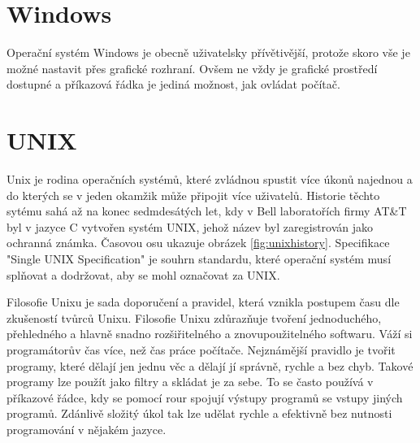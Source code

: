 \documentclass[thesis=M,czech]{FITthesis}[2012/06/26]
\begin{document}
\section{Windows}


Operační systém Windows je obecně uživatelsky přívětivější, protože skoro vše je možné nastavit přes grafické rozhraní. Ovšem ne vždy je grafické prostředí dostupné a příkazová řádka je jediná možnost, jak ovládat počítač.


\section{UNIX}

Unix je rodina operačních systémů, které zvládnou spustit více úkonů najednou a do kterých se v jeden okamžik může připojit více uživatelů. Historie těchto sytému sahá až na konec sedmdesátých let, kdy v Bell laboratořích firmy AT\&T byl v jazyce C vytvořen systém UNIX, jehož název byl zaregistrován jako ochranná známka. Časovou osu ukazuje obrázek \ref{fig:unixhistory}. Specifikace "Single UNIX Specification" je souhrn standardu, které operační systém musí splňovat a dodržovat, aby se mohl označovat za UNIX.

Filosofie Unixu je sada doporučení a pravidel, která vznikla postupem času dle zkušeností tvůrců Unixu. Filosofie Unixu zdůrazňuje tvoření jednoduchého, přehledného a hlavně snadno rozšiřitelného a znovupoužitelného softwaru. Váží si programátorův čas více, než čas práce počítače. Nejznámější pravidlo je tvořit programy, které dělají jen jednu věc a dělají jí správně, rychle a bez chyb. Takové programy lze použít jako filtry a skládat je za sebe. To se často používá v příkazové řádce, kdy se pomocí rour spojují výstupy programů se vstupy jiných programů. Zdánlivě složitý úkol tak lze udělat rychle a efektivně bez nutnosti programování v nějakém jazyce.
\end{document}

